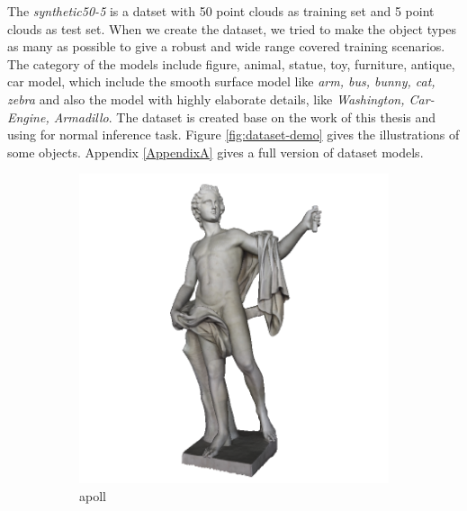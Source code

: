 \documentclass[border=15pt, multi, tikz]{article}
\begin{document}
The \textit{synthetic50-5} is a datset with 50 point clouds as training set and 5 point clouds as test set. When we create the dataset, we tried to make the object types as many as possible to give a robust and wide range covered training scenarios. The category of the models include figure, animal, statue, toy, furniture, antique, car model, which include the smooth surface model like \textit{arm, bus, bunny, cat, zebra} and also the model with highly elaborate details, like \textit{Washington, Car-Engine, Armadillo}. 
The dataset is created base on the work of this thesis and using for normal inference task. Figure \ref{fig:dataset-demo} gives the illustrations of some objects. Appendix \ref{AppendixA} gives a full version of dataset models.

\begin{figure}[!h]
	\centering
	\begin{subfigure}[b]{0.23\linewidth}
		\includegraphics[width=\linewidth]{./Figures/train-dataset/00.apoll.png}
		\caption{apoll}
	\end{subfigure}
	\begin{subfigure}[b]{0.23\linewidth}

\end{subfigure}
\end{figure}
\end{document}
